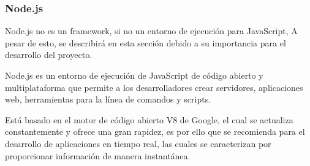 \subsubsection{Node.js}
Node.js no es un framework, si no un entorno de ejecución para JavaScript, A pesar de esto, se describirá en esta sección debido a su importancia para el desarrollo del proyecto.

Node.js es un entorno de ejecución de JavaScript de código abierto y multiplataforma que permite a los desarrolladores crear servidores, aplicaciones web, herramientas para la línea de comandos y scripts.

Está basado en el motor de código abierto V8 de Google, el cual se actualiza constantemente y ofrece una gran rapidez, es por ello que se recomienda para el desarrollo de aplicaciones en tiempo real, las cuales se caracterizan por proporcionar información de manera instantánea.